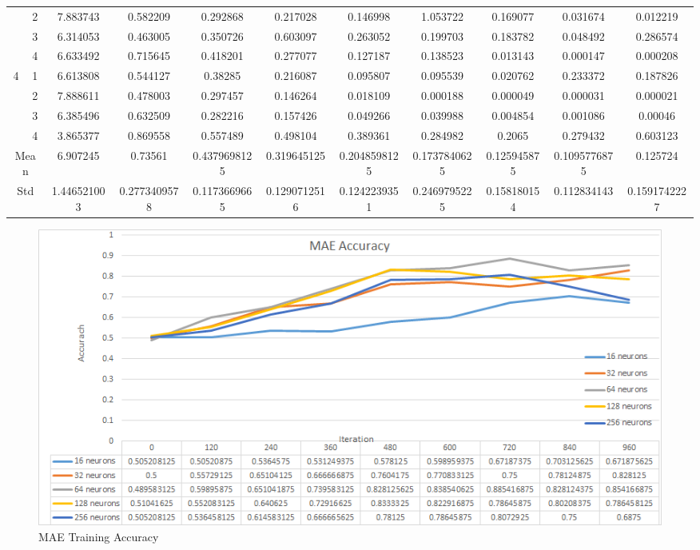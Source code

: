 \documentclass[draft,dvipsnames]{drexel-thesis}
\begin{document}
\begin{thesis}
\begin{table}[!t]
{\begin{tabular}{|c|c|c|c|c|c|c|c|c|c|c|}
                      & 2                   & 7.883743    & 0.582209     & 0.292868     & 0.217028     & 0.146998     & 1.053722     & 0.169077    & 0.031674     & 0.012219     \\ \cline{2-11} 
                      & 3                   & 6.314053    & 0.463005     & 0.350726     & 0.603097     & 0.263052     & 0.199703     & 0.183782    & 0.048492     & 0.286574     \\ \cline{2-11} 
                      & 4                   & 6.633492    & 0.715645     & 0.418201     & 0.277077     & 0.127187     & 0.138523     & 0.013143    & 0.000147     & 0.000208     \\ \hline
\multirow{4}{*}{4}    & 1                   & 6.613808    & 0.544127     & 0.38285      & 0.216087     & 0.095807     & 0.095539     & 0.020762    & 0.233372     & 0.187826     \\ \cline{2-11} 
                      & 2                   & 7.888611    & 0.478003     & 0.297457     & 0.146264     & 0.018109     & 0.000188     & 0.000049    & 0.000031     & 0.000021     \\ \cline{2-11} 
                      & 3                   & 6.385496    & 0.632509     & 0.282216     & 0.157426     & 0.049266     & 0.039988     & 0.004854    & 0.001086     & 0.00046      \\ \cline{2-11} 
                      & 4                   & 3.865377    & 0.869558     & 0.557489     & 0.498104     & 0.389361     & 0.284982     & 0.2065      & 0.279432     & 0.603123     \\ \hline
\multicolumn{2}{|c|}{Mean}                  & 6.907245    & 0.73561      & 0.4379698125 & 0.319645125  & 0.2048598125 & 0.1737840625 & 0.125945875 & 0.1095776875 & 0.125724     \\ \hline
\multicolumn{2}{|c|}{Std}                   & 1.446521003 & 0.2773409578 & 0.1173669665 & 0.1290712516 & 0.1242239351 & 0.2469795225 & 0.158180154 & 0.112834143  & 0.1591742227 \\ \hline
\end{tabular}}
\end{table}


\begin{figure}[t!]
    \centering
    \includegraphics[width=\textwidth]{pictures/result_pictures/MAE_Accuracy.png}
    \caption{MAE Training Accuracy}
    \label{fig:mae_accuracy}
\end{figure}


\end{thesis}
\end{document}

